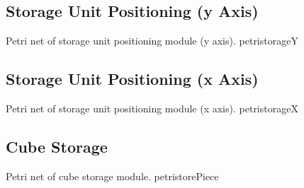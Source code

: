\subsection{Storage Unit Positioning (y Axis)}


{Petri net of storage unit positioning module (y axis).}
{petristorageY}
\subsection{Storage Unit Positioning (x Axis)}


{Petri net of storage unit positioning module (x axis).}
{petristorageX}
\subsection{Cube Storage}


{Petri net of cube storage module.}
{petristorePiece}
